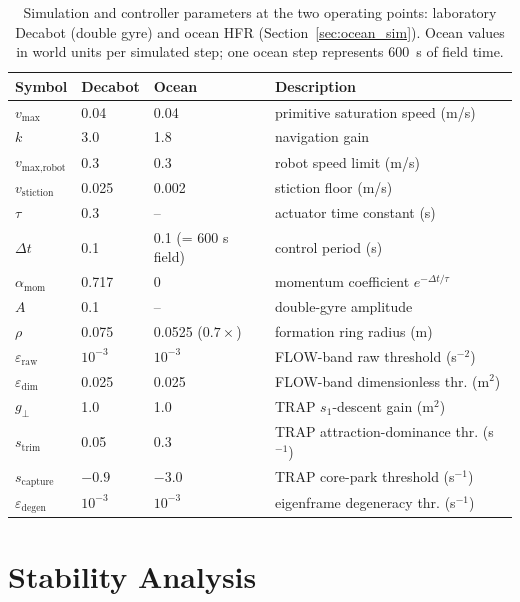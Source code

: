 \documentclass[lettersize,journal]{IEEEtran}
\begin{document}
\begin{table}[!t]
\centering
\caption{Simulation and controller parameters at the two operating
points: laboratory Decabot (double gyre) and ocean HFR
(Section~\ref{sec:ocean_sim}). Ocean values in world units per
simulated step; one ocean step represents 600~s of field time.}
\label{tab:params}
\footnotesize
\setlength{\tabcolsep}{3pt}
\begin{tabular}{llll}
\hline
\textbf{Symbol} & \textbf{Decabot} & \textbf{Ocean} & \textbf{Description} \\
\hline
$v_{\max}$ & 0.04 & 0.04 & primitive saturation speed (m/s) \\
$k$ & 3.0 & 1.8 & navigation gain \\
$v_{\text{max,robot}}$ & 0.3 & 0.3 & robot speed limit (m/s) \\
$v_{\text{stiction}}$ & 0.025 & 0.002 & stiction floor (m/s) \\
$\tau$ & 0.3 & -- & actuator time constant (s) \\
$\Delta t$ & 0.1 & 0.1 (= 600 s field) & control period (s) \\
$\alpha_{\text{mom}}$ & 0.717 & 0 & momentum coefficient $e^{-\Delta t/\tau}$ \\
$A$ & 0.1 & -- & double-gyre amplitude \\
$\rho$ & 0.075 & 0.0525 ($0.7\times$) & formation ring radius (m) \\
$\varepsilon_{\text{raw}}$ & $10^{-3}$ & $10^{-3}$ & FLOW-band raw threshold (s$^{-2}$) \\
$\varepsilon_{\text{dim}}$ & 0.025 & 0.025 & FLOW-band dimensionless thr. (m$^2$) \\
$g_\perp$ & 1.0 & 1.0 & TRAP $s_1$-descent gain (m$^2$) \\
$s_{\text{trim}}$ & 0.05 & 0.3 & TRAP attraction-dominance thr. (s$^{-1}$) \\
$s_{\text{capture}}$ & $-0.9$ & $-3.0$ & TRAP core-park threshold (s$^{-1}$) \\
$\varepsilon_{\text{degen}}$ & $10^{-3}$ & $10^{-3}$ & eigenframe degeneracy thr. (s$^{-1}$) \\
\hline
\end{tabular}
\end{table}


\section{Stability Analysis}
\label{sec:stability}
\end{document}
